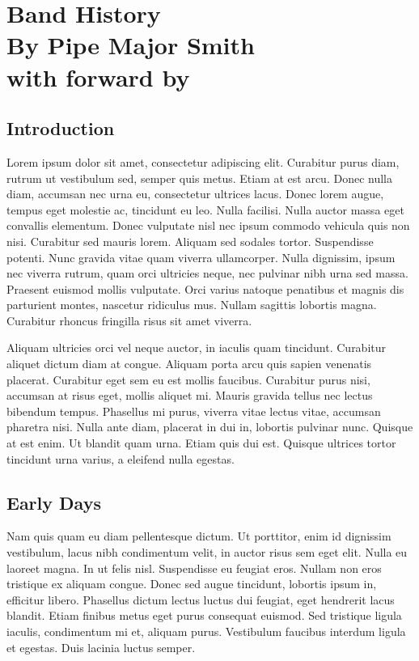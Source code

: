 \chapter{Band History\\
By Pipe Major Smith\\
with forward by}

\section*{Introduction}

Lorem ipsum dolor sit amet, consectetur adipiscing elit. Curabitur purus diam, rutrum ut vestibulum sed, semper quis metus. Etiam at est arcu. Donec nulla diam, accumsan nec urna eu, consectetur ultrices lacus. Donec lorem augue, tempus eget molestie ac, tincidunt eu leo. Nulla facilisi. Nulla auctor massa eget convallis elementum. Donec vulputate nisl nec ipsum commodo vehicula quis non nisi. Curabitur sed mauris lorem. Aliquam sed sodales tortor. Suspendisse potenti. Nunc gravida vitae quam viverra ullamcorper. Nulla dignissim, ipsum nec viverra rutrum, quam orci ultricies neque, nec pulvinar nibh urna sed massa. Praesent euismod mollis vulputate. Orci varius natoque penatibus et magnis dis parturient montes, nascetur ridiculus mus. Nullam sagittis lobortis magna. Curabitur rhoncus fringilla risus sit amet viverra.

Aliquam ultricies orci vel neque auctor, in iaculis quam tincidunt. Curabitur aliquet dictum diam at congue. Aliquam porta arcu quis sapien venenatis placerat. Curabitur eget sem eu est mollis faucibus. Curabitur purus nisi, accumsan at risus eget, mollis aliquet mi. Mauris gravida tellus nec lectus bibendum tempus. Phasellus mi purus, viverra vitae lectus vitae, accumsan pharetra nisi. Nulla ante diam, placerat in dui in, lobortis pulvinar nunc. Quisque at est enim. Ut blandit quam urna. Etiam quis dui est. Quisque ultrices tortor tincidunt urna varius, a eleifend nulla egestas. 

\section*{Early Days}

Nam quis quam eu diam pellentesque dictum. Ut porttitor, enim id dignissim vestibulum, lacus nibh condimentum velit, in auctor risus sem eget elit. Nulla eu laoreet magna. In ut felis nisl. Suspendisse eu feugiat eros. Nullam non eros tristique ex aliquam congue. Donec sed augue tincidunt, lobortis ipsum in, efficitur libero. Phasellus dictum lectus luctus dui feugiat, eget hendrerit lacus blandit. Etiam finibus metus eget purus consequat euismod. Sed tristique ligula iaculis, condimentum mi et, aliquam purus. Vestibulum faucibus interdum ligula et egestas. Duis lacinia luctus semper.

